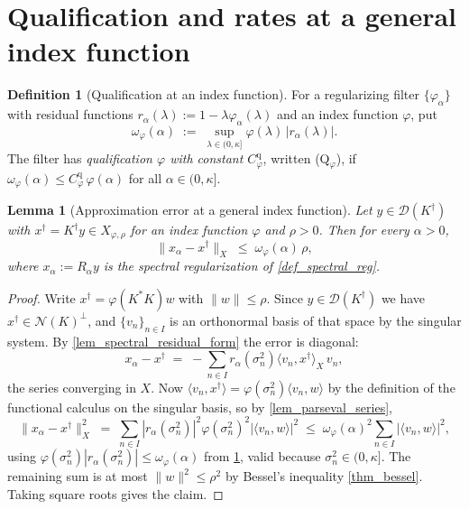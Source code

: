\documentclass[a4paper]{report}
\theoremstyle{plain}
\newtheorem{lemma}[theorem]{Lemma}
\theoremstyle{definition}
\newtheorem{definition}[theorem]{Definition}
\theoremstyle{remark}
\newcommand{\Ker}{\mathcal{N}}
\newcommand{\Dom}{\mathcal{D}}
\newcommand{\dg}{^{\dagger}}
\begin{document}
\section{Qualification and rates at a general index function}

\begin{definition}[Qualification at an index function]
  \label{def_general_qualification}
  For a regularizing filter $\{\varphi_{\alpha}\}$ with residual functions
  $r_{\alpha}(\lambda) := 1 - \lambda\varphi_{\alpha}(\lambda)$ and an index function
  $\varphi$, put
  \[
    \omega_{\varphi}(\alpha) \;:=\;
      \sup_{\lambda \in (0,\kappa]} \varphi(\lambda)\,|r_{\alpha}(\lambda)| .
  \]
  The filter has \emph{qualification $\varphi$ with constant $C_{\varphi}^{\mathrm{q}}$},
  written (Q$_{\varphi}$), if
  $\omega_{\varphi}(\alpha) \le C_{\varphi}^{\mathrm{q}}\,\varphi(\alpha)$ for all
  $\alpha \in (0,\kappa]$.
\end{definition}


\begin{lemma}[Approximation error at a general index function]
  \label{lem_general_omega}
  Let $y \in \Dom(K\dg)$ with $x\dg = K\dg y \in X_{\varphi,\rho}$ for an index function
  $\varphi$ and $\rho > 0$.  Then for every $\alpha > 0$,
  \[
    \|x_{\alpha} - x\dg\|_X \;\le\; \omega_{\varphi}(\alpha)\,\rho ,
  \]
  where $x_{\alpha} := R_{\alpha}y$ is the spectral regularization of
  \cref{def_spectral_reg}.
\end{lemma}
\begin{proof}
  Write $x\dg = \varphi(K^{*}K)w$ with $\|w\| \le \rho$.  Since $y \in \Dom(K\dg)$ we have
  $x\dg \in \Ker(K)^{\perp}$, and $\{v_n\}_{n \in I}$ is an orthonormal basis of that
  space by the singular system.  By \cref{lem_spectral_residual_form} the error is
  diagonal:
  \[
    x_{\alpha} - x\dg \;=\; -\sum_{n \in I} r_{\alpha}(\sigma_n^{2})
      \langle v_n, x\dg\rangle_X\, v_n ,
  \]
  the series converging in $X$.  Now $\langle v_n, x\dg\rangle =
  \varphi(\sigma_n^{2})\langle v_n, w\rangle$ by the definition of the functional calculus
  on the singular basis, so by \cref{lem_parseval_series},
  \[
    \|x_{\alpha}-x\dg\|_X^{2}
      \;=\; \sum_{n \in I} |r_{\alpha}(\sigma_n^{2})|^{2}\varphi(\sigma_n^{2})^{2}
        |\langle v_n,w\rangle|^{2}
      \;\le\; \omega_{\varphi}(\alpha)^{2}\sum_{n \in I}|\langle v_n,w\rangle|^{2} ,
  \]
  using $\varphi(\sigma_n^{2})|r_{\alpha}(\sigma_n^{2})| \le \omega_{\varphi}(\alpha)$
  from \cref{def_general_qualification}, valid because $\sigma_n^{2} \in (0,\kappa]$.  The
  remaining sum is at most $\|w\|^{2} \le \rho^{2}$ by Bessel's inequality
  \cref{thm_bessel}.  Taking square roots gives the claim.
\end{proof}
\end{document}
